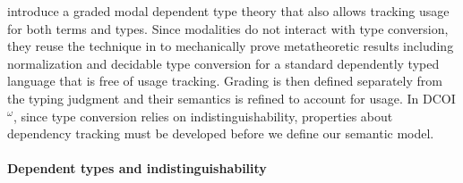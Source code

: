 \documentclass[acmsmall]{acmart}
\makeatletter
\theoremstyle{linked}
\theoremstyle{deflinked}
\theoremstyle{acmdefinition}
\newcommand{\dcoi}{DCOI\@\xspace}
\newcommand{\name}{\texorpdfstring{DCOI$^{\omega}$\@\xspace}{DCOI-omega}}
\makeatother
\begin{document}
\citet{abel:grade} introduce a graded modal dependent
type theory that also allows tracking usage for both terms and
types. %
Since modalities do not interact with type conversion,
they reuse the technique in \citet{abel:dectt} to mechanically prove
metatheoretic results including normalization and decidable type
conversion for a standard dependently typed language that is free of
usage tracking.  Grading is then defined separately from the typing
judgment and their semantics is refined to account for usage. In
\name, since type conversion relies on indistinguishability,
properties about dependency tracking must be developed before we
define our semantic model.

\paragraph{Dependent types and indistinguishability}

\end{document}
